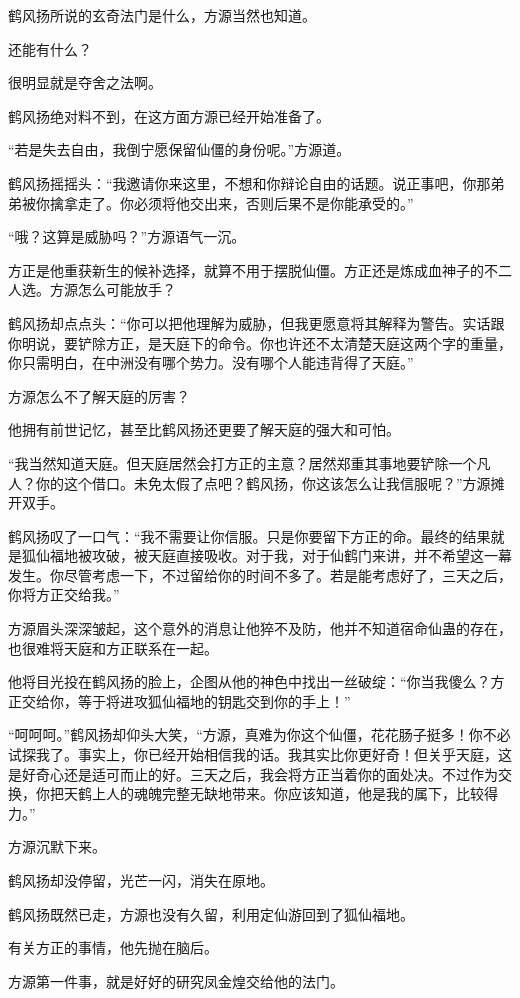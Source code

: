 \begin{this_body}
鹤风扬所说的玄奇法门是什么，方源当然也知道。

还能有什么？

很明显就是夺舍之法啊。

鹤风扬绝对料不到，在这方面方源已经开始准备了。

“若是失去自由，我倒宁愿保留仙僵的身份呢。”方源道。

鹤风扬摇摇头：“我邀请你来这里，不想和你辩论自由的话题。说正事吧，你那弟弟被你擒拿走了。你必须将他交出来，否则后果不是你能承受的。”

“哦？这算是威胁吗？”方源语气一沉。

方正是他重获新生的候补选择，就算不用于摆脱仙僵。方正还是炼成血神子的不二人选。方源怎么可能放手？

鹤风扬却点点头：“你可以把他理解为威胁，但我更愿意将其解释为警告。实话跟你明说，要铲除方正，是天庭下的命令。你也许还不太清楚天庭这两个字的重量，你只需明白，在中洲没有哪个势力。没有哪个人能违背得了天庭。”

方源怎么不了解天庭的厉害？

他拥有前世记忆，甚至比鹤风扬还更要了解天庭的强大和可怕。

“我当然知道天庭。但天庭居然会打方正的主意？居然郑重其事地要铲除一个凡人？你的这个借口。未免太假了点吧？鹤风扬，你这该怎么让我信服呢？”方源摊开双手。

鹤风扬叹了一口气：“我不需要让你信服。只是你要留下方正的命。最终的结果就是狐仙福地被攻破，被天庭直接吸收。对于我，对于仙鹤门来讲，并不希望这一幕发生。你尽管考虑一下，不过留给你的时间不多了。若是能考虑好了，三天之后，你将方正交给我。”

方源眉头深深皱起，这个意外的消息让他猝不及防，他并不知道宿命仙蛊的存在，也很难将天庭和方正联系在一起。

他将目光投在鹤风扬的脸上，企图从他的神色中找出一丝破绽：“你当我傻么？方正交给你，等于将进攻狐仙福地的钥匙交到你的手上！”

“呵呵呵。”鹤风扬却仰头大笑，“方源，真难为你这个仙僵，花花肠子挺多！你不必试探我了。事实上，你已经开始相信我的话。我其实比你更好奇！但关乎天庭，这是好奇心还是适可而止的好。三天之后，我会将方正当着你的面处决。不过作为交换，你把天鹤上人的魂魄完整无缺地带来。你应该知道，他是我的属下，比较得力。”

方源沉默下来。

鹤风扬却没停留，光芒一闪，消失在原地。

鹤风扬既然已走，方源也没有久留，利用定仙游回到了狐仙福地。

有关方正的事情，他先抛在脑后。

方源第一件事，就是好好的研究凤金煌交给他的法门。


\end{this_body}
